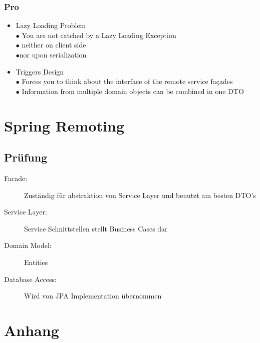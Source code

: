 \documentclass[10pt]{scrartcl}
\begin{document}
\subsubsection{Pro}
\begin{itemize}
\item Lazy Loading Problem\\
$\bullet$ You are not catched by a Lazy Loading Exception\\
\hspace*{0.5cm}$\bullet$ neither on client side\\
\hspace*{0.5cm}$\bullet$nor upon serialization
\item Triggers Design\\
$\bullet$ Forces you to think about the interface of the remote service façades\\
$\bullet$ Information from multiple domain objects can be combined in one DTO
\end{itemize}

\newpage
\section{Spring Remoting}
\subsection{Prüfung}
\begin{description}
\item[Facade:] Zuständig für abstraktion von Service Layer und benutzt am besten DTO's
\item[Service Layer:] Service Schnittstellen stellt Business Cases dar
\item[Domain Model:] Entities
\item[Database Access:] Wird von JPA Implementation übernommen
\end{description}
\section{Anhang}


\end{document}
